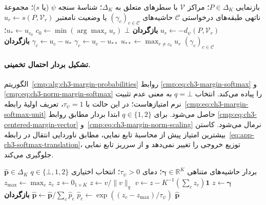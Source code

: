 \begin{algorithm}[!htbp]
\caption{زیرروال $\operatorname{ClassMargins}$: محاسبهٔ حاشیهٔ تعلق}
\label{cmp:alg:ch3-class-margins}
\begin{algorithmic}[1]
\REQUIRE بازنمایی $P\in\Delta_K$؛ مراکز $\mathcal V$ با سطرهای متعلق به $\Delta_K$؛
شناسهٔ سنجه $\psi$ (یا $s$)؛ مجموعهٔ ناتهی طبقه‌های درخواستی $\mathcal C$
\ENSURE حاشیه‌های $(\gamma_c)_{c\in\mathcal C}$ یا وضعیت نامعتبر
        \STATE $u_r\gets s(P,\mathcal V_r)$
    \ELSE
        \STATE $u_r\gets-d_\psi(P,\mathcal V_r)$
    \ENDIF
\ENDFOR
{}
    \STATE \textbf{بازگردان} $\bot$
\ENDIF
\STATE $c_0\gets\min(\arg\max_r u_r)$
\STATE $u_*\gets u_{c_0}$؛ $u_{**}\gets\max_{r\ne c_0}u_r$
        \STATE $\gamma_c\gets u_c-u_{**}$
    \ELSE
        \STATE $\gamma_c\gets u_c-u_*$ 
    \ENDIF
\ENDFOR
\STATE \textbf{بازگردان} $(\gamma_c)_{c\in\mathcal C}$
\end{algorithmic}
\end{algorithm}

\paragraph{تشکیل بردار احتمال تخمینی.}
الگوریتم~\ref{cmp:alg:ch3-margin-probabilities} روابط
\eqref{cmp:eq:ch3-margin-softmax} و
\eqref{cmp:eq:ch3-norm-margin-softmax} را پیاده می‌کند.
انتخاب $q=\bot$ به معنی عدم تثبیت نرم امتیازهاست؛
در این حالت با $\tau_\psi=1$، تعریف اولیهٔ
رابطه~\eqref{cmp:eq:ch3-margin-softmax-unit} حاصل می‌شود.
برای $q\in\{1,2\}$ ابتدا بردار مطابق روابط
\eqref{cmp:eq:ch3-centered-margin-vector}
و~\eqref{cmp:eq:ch3-margin-norm-scaling} نرمال می‌شود.
کاستن بیشترین امتیاز پیش از محاسبهٔ تابع نمایی،
مطابق ناوردایی انتقال در
رابطه~\eqref{eq:app-ch3-softmax-translation}،
توزیع خروجی را تغییر نمی‌دهد و از سرریز تابع نمایی
جلوگیری می‌کند.

\begin{algorithm}[!htbp]
\caption{زیرروال $\operatorname{MarginProbabilities}$: بردار احتمال تخمینی}
\label{cmp:alg:ch3-margin-probabilities}
\begin{algorithmic}[1]
\REQUIRE بردار حاشیه‌های متناهی $\boldsymbol\gamma\in\mathbb R^K$؛
دمای $\tau_\psi>0$؛ انتخاب اختیاری $q\in\{\bot,1,2\}$
\ENSURE $\widehat{\boldsymbol p}\in\Delta_K$
\STATE $z\gets\boldsymbol\gamma$
    \STATE $v\gets z-K^{-1}(\sum_c z_c)\mathbf1$
        \STATE $z\gets v/\|v\|_q$
    \ELSE
        \STATE $z\gets0_{1\times K}$
    \ENDIF
\ENDIF
\STATE $z_{\max}\gets\max_c z_c$
    \STATE $\widehat p_c\gets\exp((z_c-z_{\max})/\tau_\psi)$
\ENDFOR
\STATE $\widehat{\boldsymbol p}\gets
\widehat{\boldsymbol p}/\sum_c\widehat p_c$
\STATE \textbf{بازگردان} $\widehat{\boldsymbol p}$
\end{algorithmic}
\end{algorithm}

